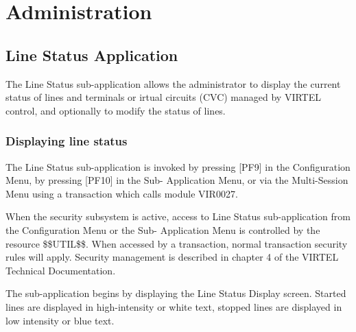 \documentclass[letterpaper,10pt,english]{sphinxmanual}
\begin{document}
\chapter{Administration}
\label{\detokenize{audit_operations_ and_performance:administration}}\label{\detokenize{audit_operations_ and_performance:index-35}}
\ignorespaces 

\section{Line Status Application}
\label{\detokenize{audit_operations_ and_performance:line-status-application}}\label{\detokenize{audit_operations_ and_performance:index-36}}
The Line Status sub-application allows the administrator to display the current status of lines and terminals or irtual circuits (CVC) managed by VIRTEL control, and optionally to modify the status of lines.

\ignorespaces 

\subsection{Displaying line status}
\label{\detokenize{audit_operations_ and_performance:displaying-line-status}}\label{\detokenize{audit_operations_ and_performance:index-37}}
The Line Status sub-application is invoked by pressing {[}PF9{]} in the Configuration Menu, by pressing {[}PF10{]} in the Sub- Application Menu, or via the Multi-Session Menu using a transaction which calls module VIR0027.

When the security subsystem is active, access to Line Status sub-application from the Configuration Menu or the Sub- Application Menu is controlled by the resource \$\$UTIL\$\$.
When accessed by a transaction, normal transaction security rules will apply. Security management is described in chapter 4 of the VIRTEL Technical Documentation.

The sub-application begins by displaying the Line Status Display screen. Started lines are displayed in high-intensity or white text, stopped lines are displayed in low intensity or blue text.
\end{document}
